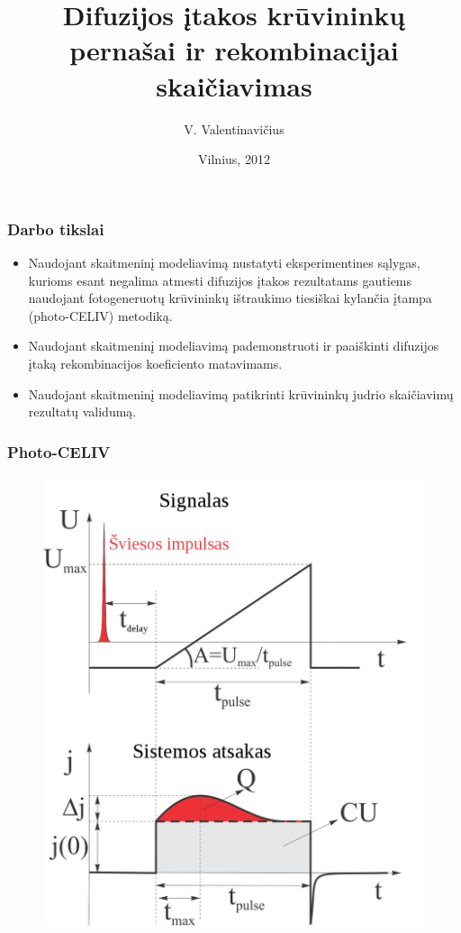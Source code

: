 \documentclass{beamer}
\title{Difuzijos įtakos krūvininkų pernašai ir rekombinacijai skaičiavimas}
\author
{V. Valentinavičius}
\date{Vilnius, 2012}
\begin{document}
\frame{\titlepage}
  \begin{frame}
    \frametitle{Darbo tikslai}
    \begin{itemize}
      \item Naudojant skaitmeninį modeliavimą nustatyti eksperimentines sąlygas, kurioms esant negalima atmesti difuzijos įtakos rezultatams gautiems naudojant fotogeneruotų krūvininkų ištraukimo tiesiškai kylančia įtampa (photo-CELIV) metodiką.
	\item Naudojant skaitmeninį modeliavimą pademonstruoti ir paaiškinti difuzijos įtaką rekombinacijos koeficiento matavimams.
	\item Naudojant skaitmeninį modeliavimą patikrinti krūvininkų judrio skaičiavimų rezultatų validumą.
    \end{itemize}
  \end{frame}
  \begin{frame}
    \frametitle{Photo-CELIV}
    \begin{figure}
    	\includegraphics[height=0.8\textheight]{./media/celivTransients.png}
    \end{figure}
  \end{frame}
\end{document}
